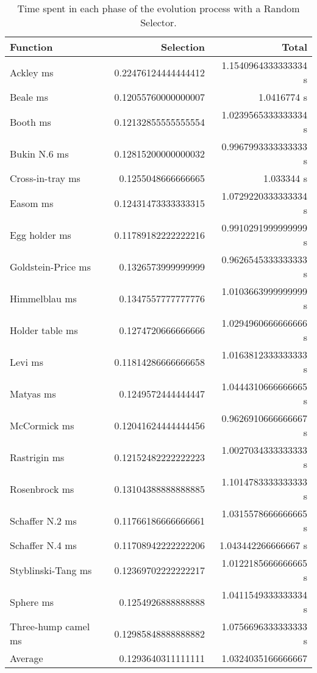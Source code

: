     \begin{table}[H]
      \centering
      \begin{tabular}{|l|r|r|}
        \hline
        Function  & Selection & Total \\
        \hline\hline
        Ackley ms	& 0.22476124444444412	& 1.1540964333333334 s\\\hline
        Beale ms	& 0.12055760000000007	& 1.0416774 s\\\hline
        Booth ms	& 0.12132855555555554	& 1.0239565333333334 s\\\hline
        Bukin N.6 ms	& 0.12815200000000032	& 0.9967993333333333 s\\\hline
        Cross-in-tray ms	& 0.1255048666666665	& 1.033344 s\\\hline
        Easom ms	& 0.12431473333333315	& 1.0729220333333334 s\\\hline
        Egg holder ms	& 0.11789182222222216	& 0.9910291999999999 s\\\hline
        Goldstein-Price ms	& 0.1326573999999999	& 0.9626545333333333 s\\\hline
        Himmelblau ms	& 0.1347557777777776	& 1.0103663999999999 s\\\hline
        Holder table ms	& 0.1274720666666666	& 1.0294960666666666 s\\\hline
        Levi ms	& 0.11814286666666658	& 1.0163812333333333 s\\\hline
        Matyas ms	& 0.1249572444444447	& 1.0444310666666665 s\\\hline
        McCormick ms	& 0.12041624444444456	& 0.9626910666666667 s\\\hline
        Rastrigin ms	& 0.12152482222222223	& 1.0027034333333333 s\\\hline
        Rosenbrock ms	& 0.13104388888888885	& 1.1014783333333333 s\\\hline
        Schaffer N.2 ms	& 0.11766186666666661	& 1.0315578666666665 s\\\hline
        Schaffer N.4 ms	& 0.11708942222222206	& 1.043442266666667 s\\\hline
        Styblinski-Tang ms	& 0.12369702222222217	& 1.0122185666666665 s\\\hline
        Sphere ms	& 0.1254926888888888	& 1.0411549333333334 s\\\hline
        Three-hump camel ms	& 0.12985848888888882	& 1.0756696333333333 s\\\hline\hline 
        
        Average	& 0.1293640311111111	& 1.0324035166666667 \\\hline
      \end{tabular}
      \caption{
        Time spent in each phase of the evolution process with a Random Selector.
      }
      \label{tab:fn_opt:results:time}
    \end{table}

